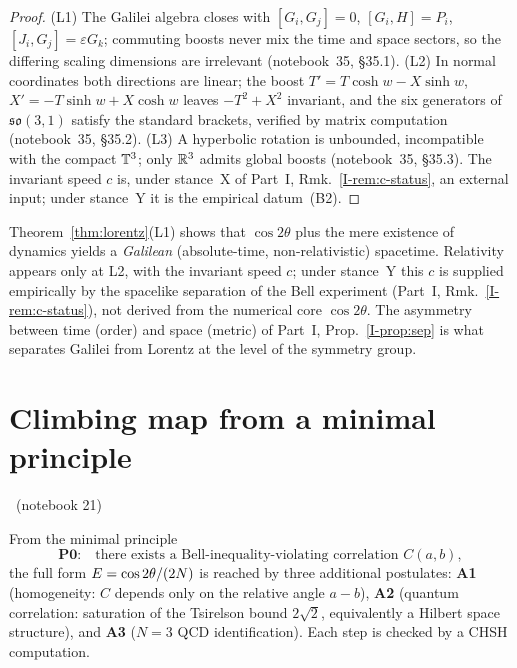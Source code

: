 \documentclass[11pt]{article}
\begin{document}
\begin{proof}
(L1) The Galilei algebra closes with $[G_i,G_j]=0$, $[G_i,H]=P_i$, $[J_i,G_j]=\varepsilon
G_k$; commuting boosts never mix the time and space sectors, so the differing scaling
dimensions are irrelevant (notebook~35, \S35.1). (L2) In normal coordinates both
directions are linear; the boost $T'=T\cosh w-X\sinh w$, $X'=-T\sinh w+X\cosh w$ leaves
$-T^2+X^2$ invariant, and the six generators of $\mathfrak{so}(3,1)$ satisfy the standard
brackets, verified by matrix computation (notebook~35, \S35.2). (L3) A hyperbolic rotation
is unbounded, incompatible with the compact $\mathbb{T}^3$; only $\mathbb{R}^3$ admits global boosts
(notebook~35, \S35.3). The invariant speed $c$ is, under stance~X of Part~I,
Rmk.~\ref{I-rem:c-status}, an external input; under stance~Y it is the empirical datum~(B2).
\end{proof}

\begin{remark}\label{rem:nonrel}
Theorem~\ref{thm:lorentz}(L1) shows that $\cos2\theta$ plus the mere existence of dynamics
yields a \emph{Galilean} (absolute-time, non-relativistic) spacetime. Relativity appears
only at L2, with the invariant speed $c$; under stance~Y this $c$ is supplied empirically
by the spacelike separation of the Bell experiment (Part~I, Rmk.~\ref{I-rem:c-status}),
not derived from the numerical core $\cos2\theta$. The asymmetry between time (order) and
space (metric) of Part~I, Prop.~\ref{I-prop:sep} is what separates Galilei from Lorentz at
the level of the symmetry group.
\end{remark}

\section{Climbing map from a minimal principle}\label{sec:climb}
\established\ (notebook 21)

\begin{proposition}\label{prop:climb}
From the minimal principle
\[
\textbf{P0:}\quad\text{there exists a Bell-inequality-violating correlation } C(a,b),
\]
the full form $E=\cos2\theta/(2N)$ is reached by three additional postulates:
\textbf{A1} (homogeneity: $C$ depends only on the relative angle $a-b$), \textbf{A2}
(quantum correlation: saturation of the Tsirelson bound $2\sqrt2$, equivalently a Hilbert
space structure), and \textbf{A3} ($N=3$ QCD identification). Each step is checked by a
CHSH computation.
\end{proposition}
\end{document}
